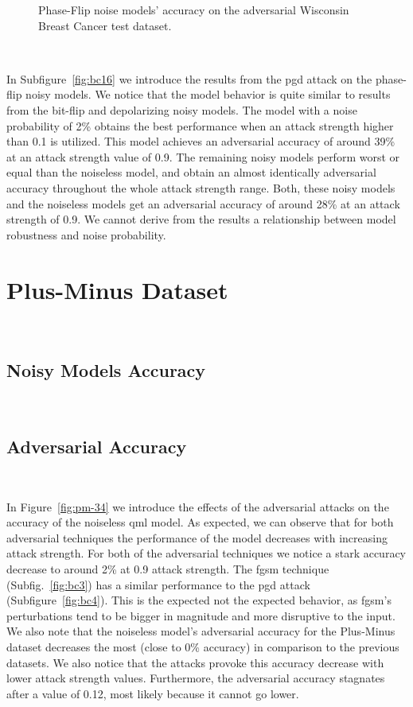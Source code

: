 \begin{figure}[!h]
  \caption{Phase-Flip noise models' accuracy on the adversarial Wisconsin Breast Cancer test dataset.}
  \label{fig:bc-1516}
\end{figure} \

In Subfigure~\ref{fig:bc16} we introduce the results from the \ac{pgd}
attack on the phase-flip noisy models. We notice that the model behavior
is quite similar to results from the bit-flip and depolarizing noisy
models. The model with a noise probability of 2\% obtains the best performance
when an attack strength higher than 0.1 is utilized. This model achieves
an adversarial accuracy of around 39\% at an attack strength value of
0.9. The remaining noisy models perform worst or equal than the
noiseless model, and obtain an almost identically adversarial
accuracy throughout the whole attack strength range. Both, these noisy
models and the noiseless models get an adversarial accuracy of around
28\% at an attack strength of 0.9. We cannot derive from the results
a relationship between model robustness and noise probability. \

\section{Plus-Minus Dataset}\label{section:plus-minus-eval} \

\subsection{Noisy Models Accuracy}\label{subsection:plus-minus-noisy-acc} \

\subsection{Adversarial Accuracy}\label{subsection:plus-minus-adv-acc} \

In Figure~\ref{fig:pm-34} we introduce the effects of the
adversarial attacks on the accuracy of the noiseless \ac{qml}
model. As expected, we can observe that for both adversarial
techniques the performance of the model decreases with increasing
attack strength. For both of the adversarial techniques
we notice a stark accuracy decrease to around 2\% at 0.9 attack
strength. The \ac{fgsm} technique (Subfig.~\ref{fig:bc3}) has a
similar performance to the \ac{pgd} attack (Subfigure~\ref{fig:bc4}).
This is the expected not the expected behavior, as \ac{fgsm}'s
perturbations tend to be bigger in magnitude and more disruptive
to the input. We also note that the noiseless model's adversarial
accuracy for the Plus-Minus dataset decreases the most (close to
0\% accuracy) in comparison to the previous datasets. We also
notice that the attacks provoke this accuracy decrease with
lower attack strength values. Furthermore, the adversarial accuracy
stagnates after a value of 0.12, most likely because it cannot
go lower. \

